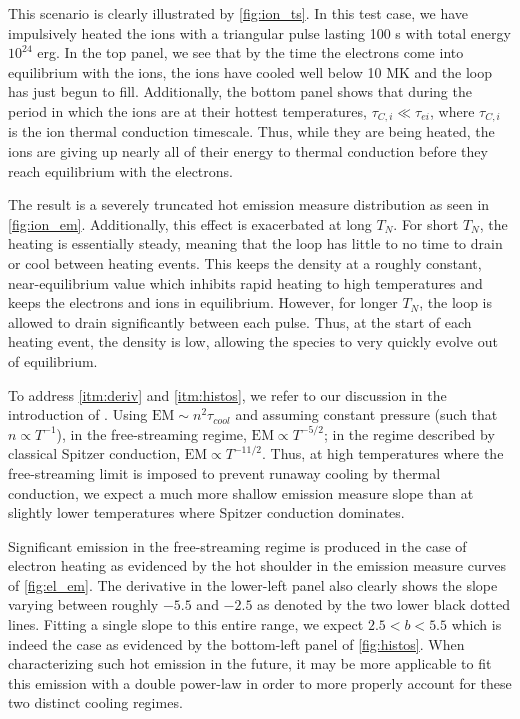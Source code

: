 \documentclass[apj]{emulateapj}
\begin{document}
	\par This scenario is clearly illustrated by \autoref{fig:ion_ts}. In this test case, we have impulsively heated the ions with a triangular pulse lasting 100 s with total energy $10^{24}$ erg. In the top panel, we see that by the time the electrons come into equilibrium with the ions, the ions have cooled well below 10 MK and the loop has just begun to fill. Additionally, the bottom panel shows that during the period in which the ions are at their hottest temperatures, $\tau_{C,i}\ll\tau_{ei}$, where $\tau_{C,i}$ is the ion thermal conduction timescale. Thus, while they are being heated, the ions are giving up nearly all of their energy to thermal conduction before they reach equilibrium with the electrons.
	\par The result is a severely truncated hot emission measure distribution as seen in \autoref{fig:ion_em}. Additionally, this effect is exacerbated at long $T_N$. For short $T_N$, the heating is essentially steady, meaning that the loop has little to no time to drain or cool between heating events. This keeps the density at a roughly constant, near-equilibrium value which inhibits rapid heating to high temperatures and keeps the electrons and ions in equilibrium. However, for longer $T_N$, the loop is allowed to drain significantly between each pulse. Thus, at the start of each heating event, the density is low, allowing the species to very quickly evolve out of equilibrium. 
	\par To address \autoref{itm:deriv} and \autoref{itm:histos}, we refer to our discussion in the introduction of . Using $\mathrm{EM}\sim n^2\tau_{cool}$ and assuming constant pressure (such that $n\propto T^{-1}$), in the free-streaming regime, $\mathrm{EM}\propto T^{-5/2}$; in the regime described by classical Spitzer conduction, $\mathrm{EM}\propto T^{-11/2}$. Thus, at high temperatures where the free-streaming limit is imposed to prevent runaway cooling by thermal conduction, we expect a much more shallow emission measure slope than at slightly lower temperatures where Spitzer conduction dominates.
	\par Significant emission in the free-streaming regime is produced in the case of electron heating as evidenced by the hot shoulder in the emission measure curves of \autoref{fig:el_em}. The derivative in the lower-left panel also clearly shows the slope varying between roughly $-5.5$ and $-2.5$ as denoted by the two lower black dotted lines. Fitting a single slope to this entire range, we expect $2.5<b<5.5$ which is indeed the case as evidenced by the bottom-left panel of \autoref{fig:histos}. When characterizing such hot emission in the future, it may be more applicable to fit this emission with a double power-law in order to more properly account for these two distinct cooling regimes.
\end{document}
